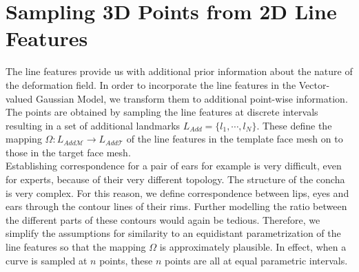\section{Sampling 3D Points from 2D Line Features} 
The line features provide us with additional prior information about the nature of the deformation field. In order to incorporate the line features in the Vector-valued Gaussian Model, we transform them to additional point-wise information. The points are obtained by sampling the line features at discrete intervals resulting in a set of additional landmarks $L_{Add} = \{l_{1}, \cdots, l_{N}\}$. These define the mapping $\Omega:L_{Add\mathcal{M}} \rightarrow L_{Add\mathcal{T}}$ of the line features in the template face mesh on to those in the target face mesh.\\
Establishing correspondence for a pair of ears for example is very difficult, even for
experts, because of their very different topology. The structure of the concha is very
complex. For this reason, we define correspondence between lips, eyes and ears through the contour lines of their rims. Further modelling the ratio between the different parts of these contours would again be tedious. Therefore, we simplify the assumptions for similarity to an equidistant parametrization of the line features so that the mapping $\Omega$ is approximately plausible. In effect, when a curve is sampled at $n$ points, these $n$ points are all at equal parametric intervals.

\def\earpathf{(-1,1.5) .. controls (-1,2.3) and (1,2.8) .. (1,1.5) .. controls (1, -.2) and (0.3,-.1) .. (0.3,-1) .. controls (0.2,-1.5) and (-.5, -1.7) .. (-1,-1.25);}
\def\earpathl{(3,2) .. controls (3,3.3) and (5.6,3.7) .. (5.6,2) .. controls (5.6, 0) and (4.6,0) .. (4.6,-1.3) .. controls (4.6,-2) and (3.5, -2) .. (3,-1.5);}

